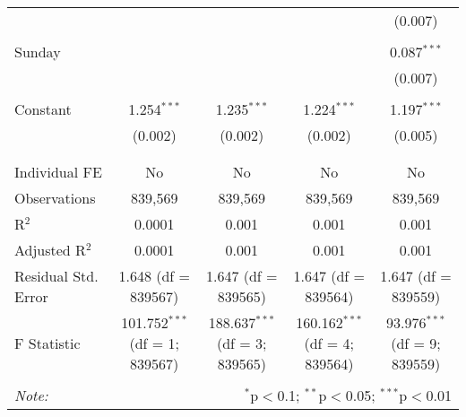 \documentclass[
]{article}
\begin{document}
\begin{table}[!htbp]
{\begin{tabular}{@{\extracolsep{5pt}}lcccc}
  &  &  &  & (0.007) \\ 
  & & & & \\ 
 Sunday &  &  &  & 0.087$^{***}$ \\ 
  &  &  &  & (0.007) \\ 
  & & & & \\ 
 Constant & 1.254$^{***}$ & 1.235$^{***}$ & 1.224$^{***}$ & 1.197$^{***}$ \\ 
  & (0.002) & (0.002) & (0.002) & (0.005) \\ 
  & & & & \\ 
\hline \\[-1.8ex] 
Individual FE & No & No & No & No \\ 
Observations & 839,569 & 839,569 & 839,569 & 839,569 \\ 
R$^{2}$ & 0.0001 & 0.001 & 0.001 & 0.001 \\ 
Adjusted R$^{2}$ & 0.0001 & 0.001 & 0.001 & 0.001 \\ 
Residual Std. Error & 1.648 (df = 839567) & 1.647 (df = 839565) & 1.647 (df = 839564) & 1.647 (df = 839559) \\ 
F Statistic & 101.752$^{***}$ (df = 1; 839567) & 188.637$^{***}$ (df = 3; 839565) & 160.162$^{***}$ (df = 4; 839564) & 93.976$^{***}$ (df = 9; 839559) \\ 
\hline 
\hline \\[-1.8ex] 
\textit{Note:}  & \multicolumn{4}{r}{$^{*}$p$<$0.1; $^{**}$p$<$0.05; $^{***}$p$<$0.01} \\ 
\end{tabular}
} 
\end{table} 
\newpage
\end{document}
